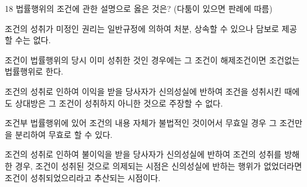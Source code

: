 \begin{question}{18}
법률행위의 조건에 관한 설명으로 옳은 것은? (다툼이 있으면 판례에 따름)
\begin{choices}
  \item 조건의 성취가 미정인 권리는 일반규정에 의하여 처분, 상속할 수 있으나 담보로 제공할 수는 없다.
  \item 조건이 법률행위의 당시 이미 성취한 것인 경우에는 그 조건이 해제조건이면 조건없는 법률행위로 한다.
  \item 조건의 성취로 인하여 이익을 받을 당사자가 신의성실에 반하여 조건을 성취시킨 때에도 상대방은 그 조건이 성취하지 아니한 것으로 주장할 수 없다.
  \item 조건부 법률행위에 있어 조건의 내용 자체가 불법적인 것이어서 무효일 경우 그 조건만을 분리하여 무효로 할 수 있다.
  \item 조건의 성취로 인하여 불이익을 받을 당사자가 신의성실에 반하여 조건의 성취를 방해한 경우, 조건이 성취된 것으로 의제되는 시점은 신의성실에 반하는 행위가 없었더라면 조건이 성취되었으리라고 추산되는 시점이다.
\end{choices}
\end{question}
